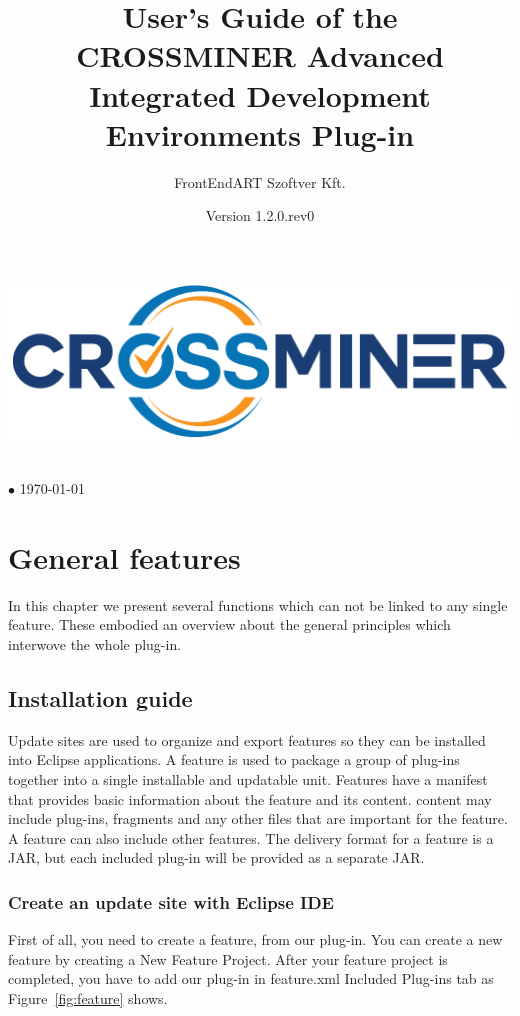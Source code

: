 \documentclass[11pt,a4paper]{book}
\author{FrontEndART Szoftver Kft.}
\title{User's Guide of the CROSSMINER Advanced Integrated Development Environments Plug-in}
\date{Version 1.2.0.rev0}
\makeatletter
\renewcommand{\maketitle}{
\vspace*{.1\textheight}
\begin{center}
	\includegraphics[width=.6\textwidth]{pic/CROSSMINER-logo-large.png}
\end{center}
\begin{center}
	\Huge\@title
\end{center}
\vfill
\begin{center}
	\large\@author\\\@date{} $\bullet$ \today
\end{center}
}
\makeatother
\begin{document}
	
\begin{titlepage}
	\maketitle
\end{titlepage}

\chapter{General features}

In this chapter we present several functions which can not be linked to any single feature.
These embodied an overview about the general principles which interwove the whole plug-in.

\section{Installation guide}
Update sites are used to organize and export features so they can be installed into Eclipse applications. A feature is used to package a group of plug-ins together into a single installable and updatable unit. Features have a manifest that provides basic information about the feature and its content. content may include plug-ins, fragments and any other files that are important for the feature. A feature can also include other features. The delivery format for a feature is a JAR, but each included plug-in will be provided as a separate JAR.

\subsection{Create an update site with Eclipse IDE}

First of all, you need to create a feature, from our plug-in. You can create a new feature by creating a New Feature Project. After your feature project is completed, you have to add our plug-in in feature.xml Included Plug-ins tab as Figure~\ref{fig:feature} shows.
\end{document}

